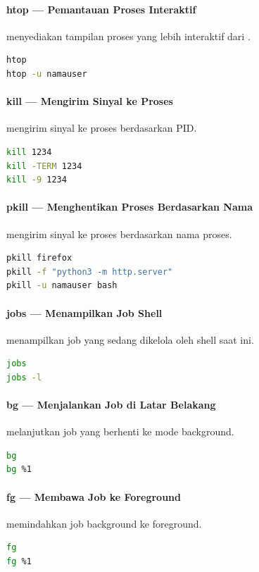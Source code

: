\paragraph*{htop --- Pemantauan Proses Interaktif}
 menyediakan tampilan proses yang lebih interaktif dari .
\begin{lstlisting}[language=bash]
htop
htop -u namauser
\end{lstlisting}

\paragraph*{kill --- Mengirim Sinyal ke Proses}
 mengirim sinyal ke proses berdasarkan PID.
\begin{lstlisting}[language=bash]
kill 1234
kill -TERM 1234
kill -9 1234
\end{lstlisting}

\paragraph*{pkill --- Menghentikan Proses Berdasarkan Nama}
 mengirim sinyal ke proses berdasarkan nama proses.
\begin{lstlisting}[language=bash]
pkill firefox
pkill -f "python3 -m http.server"
pkill -u namauser bash
\end{lstlisting}

\paragraph*{jobs --- Menampilkan Job Shell}
 menampilkan job yang sedang dikelola oleh shell saat ini.
\begin{lstlisting}[language=bash]
jobs
jobs -l
\end{lstlisting}

\paragraph*{bg --- Menjalankan Job di Latar Belakang}
 melanjutkan job yang berhenti ke mode background.
\begin{lstlisting}[language=bash]
bg
bg %1
\end{lstlisting}

\paragraph*{fg --- Membawa Job ke Foreground}
 memindahkan job background ke foreground.
\begin{lstlisting}[language=bash]
fg
fg %1
\end{lstlisting}

